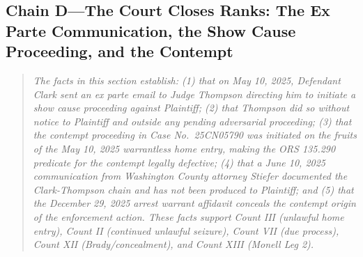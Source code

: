 \documentclass[12pt,letterpaper]{article}
\begin{document}
	\subsection*{Chain D---The Court Closes Ranks: The Ex Parte Communication, the Show Cause Proceeding, and the Contempt}
	\begin{quote}
		\textit{The facts in this section establish: (1) that on
			May 10, 2025, Defendant Clark sent an ex parte email to Judge
			Thompson directing him to initiate a show cause proceeding
			against Plaintiff; (2) that Thompson did so without notice to
			Plaintiff and outside any pending adversarial proceeding;
			(3) that the contempt proceeding in Case No.\ 25CN05790 was
			initiated on the fruits of the May 10, 2025 warrantless home
			entry, making the ORS 135.290 predicate for the contempt
			legally defective; (4) that a June 10, 2025 communication from
			Washington County attorney Stiefer documented the
			Clark-Thompson chain and has not been produced to Plaintiff;
			and (5) that the December 29, 2025 arrest warrant affidavit
			conceals the contempt origin of the enforcement action. These
			facts support Count III (unlawful home entry), Count II
			(continued unlawful seizure), Count VII (due process),
			Count XII (Brady/concealment), and Count XIII (Monell Leg 2).}
	\end{quote}
\end{document}
